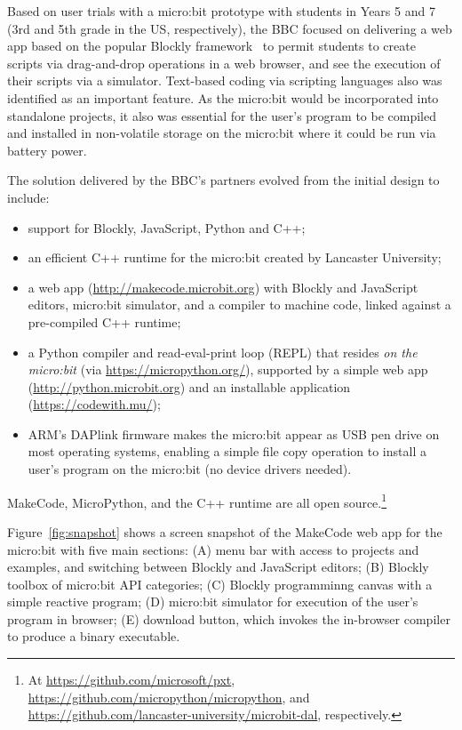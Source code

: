 Based on user trials with a micro:bit prototype with students in Years 5 and 7 (3rd and 5th grade
in the US, respectively), the BBC focused on delivering a web app 
based on the popular Blockly framework~\cite{Blocky2015} to permit students to
create scripts via drag-and-drop operations in a web browser, and see
the execution of their scripts via a simulator.
Text-based coding via scripting languages also 
was identified as an important feature. As the micro:bit would be incorporated 
into standalone projects, it also was essential for the user's program to be 
compiled and installed in non-volatile storage on the micro:bit where it 
could be run via battery power.


The solution delivered by the BBC's partners evolved from the initial
design to include:
\begin{itemize}
\item support for Blockly, JavaScript, Python and C++;
\item an efficient C++ runtime for the micro:bit created by Lancaster
University;
\item a web app (\url{http://makecode.microbit.org})
with Blockly and JavaScript editors, micro:bit simulator, 
and a compiler to machine code, linked against a pre-compiled C++ runtime;
\item a Python compiler and read-eval-print loop (REPL) that resides
{\em on the micro:bit} (via \url{https://micropython.org/}), 
supported by a simple web app (\url{http://python.microbit.org}) and 
an installable application (\url{https://codewith.mu/});
\item ARM's DAPlink firmware makes the micro:bit appear as USB pen drive 
on most operating systems, enabling a simple file copy operation to 
install a user's program on the micro:bit (no device drivers needed).
\end{itemize}
MakeCode, MicroPython, and the C++ runtime are all open source.\footnote{
At \url{https://github.com/microsoft/pxt},
\url{https://github.com/micropython/micropython},
and \url{https://github.com/lancaster-university/microbit-dal}, 
respectively.}

Figure~\ref{fig:snapshot} shows a screen snapshot of the MakeCode web app
for the micro:bit with five main sections: (A) menu bar with access to projects
and examples, and switching between Blockly and JavaScript editors; (B)
Blockly toolbox of micro:bit API categories; (C) Blockly programminng
canvas with a simple reactive program; (D) micro:bit simulator for execution
of the user's program in browser; (E) download button, which invokes the in-browser
compiler to produce a binary executable. 

